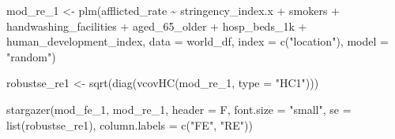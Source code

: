 \documentclass[11pt,preprint, authoryear]{elsarticle}
\numberwithin{equation}{section}
\numberwithin{figure}{section}
\numberwithin{table}{section}
\newenvironment{Shaded}{\begin{snugshade}}{\end{snugshade}}
\newcommand{\AttributeTok}[1]{\textcolor[rgb]{0.77,0.63,0.00}{#1}}
\newcommand{\FunctionTok}[1]{\textcolor[rgb]{0.00,0.00,0.00}{#1}}
\newcommand{\NormalTok}[1]{#1}
\newcommand{\OtherTok}[1]{\textcolor[rgb]{0.56,0.35,0.01}{#1}}
\newcommand{\SpecialCharTok}[1]{\textcolor[rgb]{0.00,0.00,0.00}{#1}}
\newcommand{\StringTok}[1]{\textcolor[rgb]{0.31,0.60,0.02}{#1}}
\begin{document}
\begin{Shaded}
\begin{Highlighting}[]
\NormalTok{mod\_re\_1 }\OtherTok{\textless{}{-}} \FunctionTok{plm}\NormalTok{(afflicted\_rate }\SpecialCharTok{\textasciitilde{}}\NormalTok{ stringency\_index.x }\SpecialCharTok{+}\NormalTok{ smokers}
   \SpecialCharTok{+}\NormalTok{ handwashing\_facilities }\SpecialCharTok{+}\NormalTok{ aged\_65\_older }\SpecialCharTok{+}\NormalTok{ hosp\_beds\_1k}
   \SpecialCharTok{+}\NormalTok{ human\_development\_index,}
                   \AttributeTok{data =}\NormalTok{ world\_df,}
                   \AttributeTok{index =} \FunctionTok{c}\NormalTok{(}\StringTok{"location"}\NormalTok{),}
                  \AttributeTok{model =} \StringTok{"random"}\NormalTok{)}

\NormalTok{robustse\_re1 }\OtherTok{\textless{}{-}} \FunctionTok{sqrt}\NormalTok{(}\FunctionTok{diag}\NormalTok{(}\FunctionTok{vcovHC}\NormalTok{(mod\_re\_1, }\AttributeTok{type =} \StringTok{"HC1"}\NormalTok{)))}
\end{Highlighting}
\end{Shaded}

\begin{Shaded}
\begin{Highlighting}[]
\FunctionTok{stargazer}\NormalTok{(mod\_fe\_1, mod\_re\_1, }\AttributeTok{header =}\NormalTok{ F, }\AttributeTok{font.size =} \StringTok{"small"}\NormalTok{, }\AttributeTok{se =} \FunctionTok{list}\NormalTok{(robustse\_re1),}
    \AttributeTok{column.labels =} \FunctionTok{c}\NormalTok{(}\StringTok{"FE"}\NormalTok{, }\StringTok{"RE"}\NormalTok{))}
\end{Highlighting}
\end{Shaded}
\end{document}
